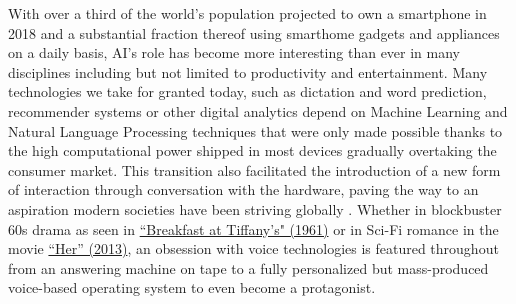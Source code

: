 


With over a third of the world's population projected to own a smartphone in 2018 \cite{statistasmartphones} and a substantial fraction thereof using smarthome gadgets and appliances on a daily basis, AI's role has become more interesting than ever in many disciplines including but not limited to productivity and entertainment.
Many technologies we take for granted today, such as dictation and word prediction, recommender systems or other digital analytics depend on Machine Learning and Natural Language Processing techniques that were only made possible thanks to the high computational power shipped in most devices gradually overtaking the consumer market.
This transition also facilitated the introduction of a new form of interaction through conversation with the hardware, paving the way to an aspiration modern societies have been striving globally \cite{Starwars}.
Whether in blockbuster 60s drama as seen in \href{http://www.imdb.com/title/tt0054698/?ref_=nv_sr_1}{``Breakfast at Tiffany's" (1961)} or in Sci-Fi romance in the movie \hypertarget{hermovie}{\href{http://www.imdb.com/title/tt1798709/}{``Her'' (2013)}}, an obsession with voice technologies is featured throughout from an answering machine on tape to a fully personalized but mass-produced voice-based operating system to even become a protagonist.\\

